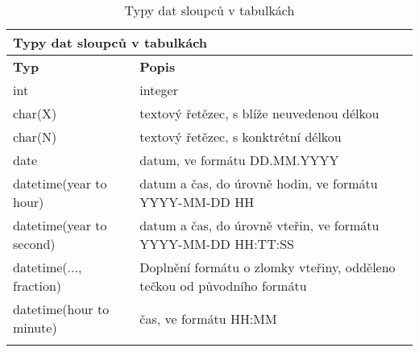 \def\arraystretch{1.5}
\begin{longtable}{|l|p{9cm}|} \hline
	\multicolumn{2}{|l|}{\textbf{Typy dat sloupců v tabulkách}} \\ \hline
	\textbf{Typ} & \textbf{Popis} \\ \hline
	
	int	& integer \\ \hline
	
	char(X)		& textový řetězec, s blíže neuvedenou délkou
	 \\ \hline
	
	char(N)		& textový řetězec, s konktrétní délkou
	 \\ \hline	
	
	date	& datum, ve formátu DD.MM.YYYY
	 \\ \hline	
	 
 	datetime(year to hour)		& datum a čas, do úrovně hodin, ve formátu YYYY-MM-DD HH
 	
	 \\ \hline
	 
 	datetime(year to second)		& datum a čas, do úrovně vteřin, ve formátu YYYY-MM-DD HH:TT:SS
 	
	 \\ \hline
	 
 	datetime(..., fraction)		& Doplnění formátu o zlomky vteřiny, odděleno tečkou od původního formátu
 	
	 \\ \hline
	 
 	datetime(hour to minute)		& čas, ve formátu HH:MM
	 \\ \hline
	
	\caption{Typy dat sloupců v tabulkách}
	\label{table:nonfunc_req_be}
\end{longtable}
